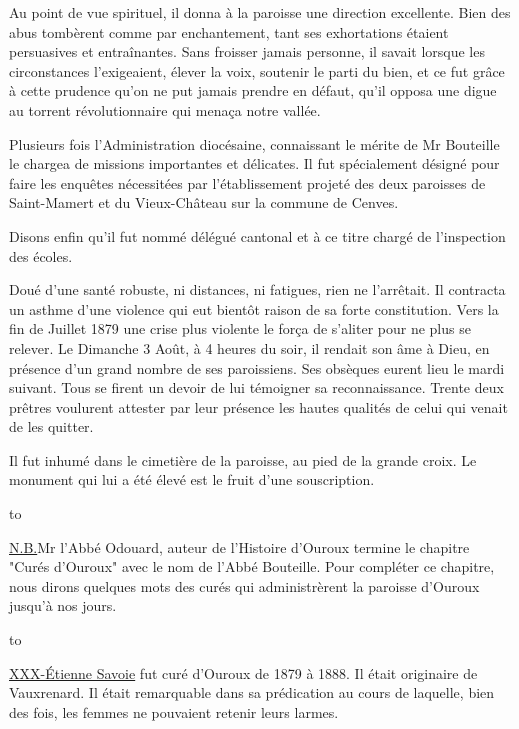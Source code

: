 Au point de vue spirituel, il donna à la paroisse une direction excellente. Bien des abus tombèrent comme par enchantement, tant ses exhortations étaient persuasives et entraînantes. Sans froisser jamais personne, il savait lorsque les circonstances l'exigeaient, élever la voix, soutenir le parti du bien, et ce fut grâce à cette prudence qu'on ne put jamais prendre en défaut, qu'il opposa une digue au torrent révolutionnaire qui menaça notre vallée.

Plusieurs fois l'Administration diocésaine, connaissant le mérite de Mr Bouteille le chargea de missions importantes et délicates. Il fut spécialement désigné pour faire les enquêtes nécessitées par
l'établissement projeté des deux paroisses de Saint-Mamert et du Vieux-Château sur la commune de Cenves.

Disons enfin qu'il fut nommé délégué cantonal et à ce titre chargé de l'inspection des écoles.

Doué d'une santé robuste, ni distances, ni fatigues, rien ne l'arrêtait. Il contracta un asthme d'une violence qui eut bientôt raison de sa forte constitution. Vers la fin de Juillet 1879 une crise plus violente le força de s'aliter pour ne plus se relever. Le Dimanche 3 Août, à 4 heures du soir, il rendait son âme à Dieu, en présence d'un grand nombre de ses paroissiens. Ses obsèques eurent lieu le mardi suivant. Tous se firent un devoir de lui témoigner sa reconnaissance. Trente deux prêtres voulurent attester par leur présence les hautes qualités de celui qui venait de les quitter.

Il fut inhumé dans le cimetière de la paroisse, au pied de la grande croix. Le monument qui lui a été élevé est le fruit d'une souscription.

\noindent\hbox to \par
\noindent\underline{N.B.}\quad Mr l’Abbé Odouard, auteur de l’Histoire d’Ouroux termine le chapitre "Curés d’Ouroux" avec le nom de l’Abbé Bouteille. Pour compléter ce chapitre, nous dirons quelques mots des curés qui administrèrent la paroisse d’Ouroux jusqu’à nos jours.\par
\noindent\hbox to \par

\underline{XXX-Étienne Savoie} fut curé d'Ouroux de 1879 à 1888. Il était originaire de Vauxrenard. Il était remarquable dans sa prédication au cours de laquelle, bien des fois, les femmes ne pouvaient retenir leurs larmes.


